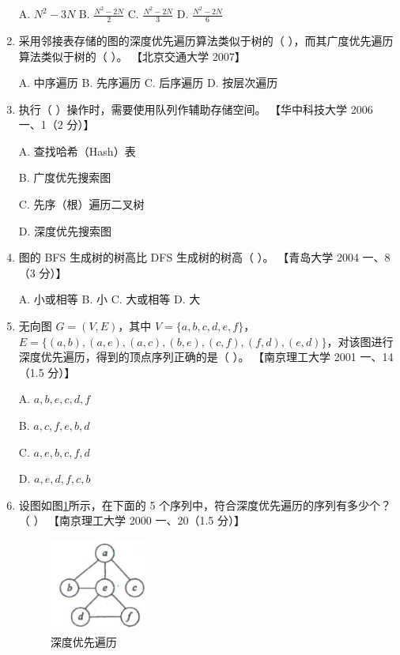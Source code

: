 \documentclass[lang=cn,newtx,10pt,scheme=chinese]{../../elegantbook}
\begin{document}
\begin{enumerate}
        A. $N^2 - 3N$ \quad B. $\frac{N^2 - 2N}{2}$ \quad C. $\frac{N^2 - 2N}{3}$ \quad D. $\frac{N^2 - 2N}{6}$  
    
        \item 采用邻接表存储的图的深度优先遍历算法类似于树的（ ），而其广度优先遍历算法类似于树的（ ）。  
        【北京交通大学 2007】 

        A. 中序遍历 \quad B. 先序遍历 \quad C. 后序遍历 \quad D. 按层次遍历  

        \item 执行（ ）操作时，需要使用队列作辅助存储空间。  
        【华中科技大学 2006 一、1（2 分）】  

        A. 查找哈希（Hash）表  

        B. 广度优先搜索图  

        C. 先序（根）遍历二叉树  

        D. 深度优先搜索图  
    
        \item 图的 BFS 生成树的树高比 DFS 生成树的树高（ ）。  
        【青岛大学 2004 一、8（3 分）】  

        A. 小或相等 \quad B. 小 \quad C. 大或相等 \quad D. 大  
    
        \item 无向图 $G = (V, E)$，其中 $V = \{a, b, c, d, e, f\}$，$E = \{(a, b), (a, e), (a, c), (b, e), (c, f), (f, d), (e, d)\}$，对该图进行深度优先遍历，得到的顶点序列正确的是（ ）。  
        【南京理工大学 2001 一、14（1.5 分）】 

        A. $a, b, e,c ,d, f$  

        B. $a, c, f, e, b, d$  

        C. $a, e, b, c, f, d$ 

        D. $a, e, d, f, c, b$  
    
        \item 设图如图\ref{fig:7-53}所示，在下面的 5 个序列中，符合深度优先遍历的序列有多少个？（ ）  
        【南京理工大学 2000 一、20（1.5 分）】  

        \begin{figure}[h!]
            \centering
            \includegraphics[width=0.3\textwidth]{../../figure/exercisePicPDF/chapter7/7-53.pdf}
            \caption{深度优先遍历}
            \label{fig:7-53}
    \end{figure}


\end{enumerate}
\end{document}
